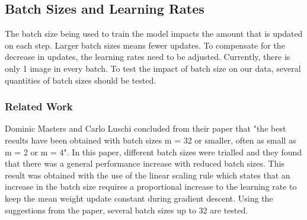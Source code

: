 \documentclass[../main.tex]{subfiles}
\begin{document}
\subsection{Batch Sizes and Learning Rates}

The batch size being used to train the model impacts the amount that is updated on each step. Larger batch sizes means fewer updates. To compensate for the decrease in updates, the learning rates need to be adjusted. Currently, there is only 1 image in every batch. To test the impact of batch size on our data, several quantities of batch sizes should be tested.

\subsubsection{Related Work}

Dominic Masters and Carlo Luschi \cite{DBLP:journals/corr/abs-1804-07612} concluded from their paper that "the best results have been obtained with batch sizes m = 32 or smaller, often as small as m = 2 or m = 4". In this paper, different batch sizes were trialled and they found that there was a general performance increase with reduced batch sizes. This result was obtained with the use of the linear scaling rule which states that an increase in the batch size requires a proportional increase to the learning rate to keep the mean weight update constant during gradient descent. Using the suggestions from the paper, several batch sizes up to 32 are tested. 
\end{document}
